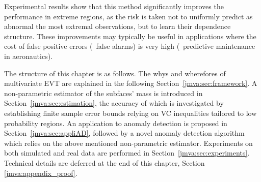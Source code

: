 Experimental results show that this method significantly
improves the performance in extreme regions, as  %
the risk
is taken not to uniformly predict as abnormal the most extremal observations, but to learn their dependence structure.
These improvements may typically be useful in applications where the cost of false positive errors (\ie~false alarms) is very high (\eg~predictive maintenance in aeronautics).


\bigskip
The structure of this chapter is as follows.  The whys
and wherefores of multivariate EVT are explained in the following
Section~\ref{jmva:sec:framework}. A non-parametric estimator of the
subfaces' mass is introduced in Section~\ref{jmva:sec:estimation}, the
accuracy of which is
investigated by establishing %
finite sample error bounds relying on  {\sc VC} inequalities
tailored to low probability regions.
An application to anomaly detection is proposed in Section~\ref{jmva:sec:appliAD}, followed by a novel anomaly detection algorithm which relies on the above mentioned non-parametric estimator. 
Experiments on both simulated and real data are performed in Section~\ref{jmva:sec:experiments}. Technical details are deferred at the end of this chapter, Section \ref{jmva:appendix_proof}.

